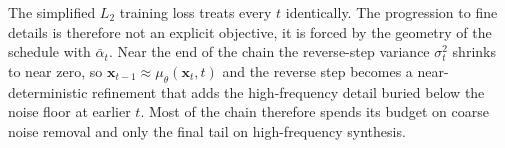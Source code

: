 \documentclass{article}
\begin{document}


The simplified $L_2$ training loss treats every $t$ identically. The
progression to fine details is therefore not an explicit objective, it is
forced by the geometry of the schedule with $\bar\alpha_t$. Near the end
of the chain the reverse-step variance $\sigma_t^2$ shrinks to near zero,
so $\mathbf{x}_{t-1} \approx \mu_\theta(\mathbf{x}_t, t)$ and the reverse
step becomes a near-deterministic refinement that adds the high-frequency
detail buried below the noise floor at earlier $t$. Most of the chain
therefore spends its budget on coarse noise removal and only the final
tail on high-frequency synthesis.
\end{document}
